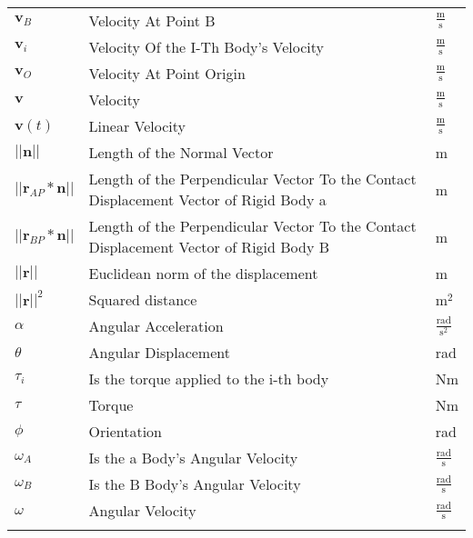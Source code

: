 \documentclass[12pt]{article}
\begin{document}
\begin{longtabu}{l X[l] l}
${\mathbf{v}_{B}}$ & Velocity At Point B & $\frac{\text{m}}{\text{s}}$
\\
${\mathbf{v}_{i}}$ & Velocity Of the I-Th Body's Velocity & $\frac{\text{m}}{\text{s}}$
\\
${\mathbf{v}_{O}}$ & Velocity At Point Origin & $\frac{\text{m}}{\text{s}}$
\\
$\mathbf{v}$ & Velocity & $\frac{\text{m}}{\text{s}}$
\\
$\mathbf{v}(t)$ & Linear Velocity & $\frac{\text{m}}{\text{s}}$
\\
$||\mathbf{n}||$ & Length of the Normal Vector & m
\\
$||{\mathbf{r}_{AP}}*\mathbf{n}||$ & Length of the Perpendicular Vector To the Contact Displacement Vector of Rigid Body a & m
\\
$||{\mathbf{r}_{BP}}*\mathbf{n}||$ & Length of the Perpendicular Vector To the Contact Displacement Vector of Rigid Body B & m
\\
$||\mathbf{r}||$ & Euclidean norm of the displacement & m
\\
${||\mathbf{r}||^{2}}$ & Squared distance & $\text{m}^{2}$
\\
$\alpha{}$ & Angular Acceleration & $\frac{\text{rad}}{\text{s}^{2}}$
\\
$\theta{}$ & Angular Displacement & rad
\\
${\tau{}_{i}}$ & Is the torque applied to the i-th body & Nm
\\
$\tau{}$ & Torque & Nm
\\
$\phi{}$ & Orientation & rad
\\
${\omega{}_{A}}$ & Is the a Body's Angular Velocity & $\frac{\text{rad}}{\text{s}}$
\\
${\omega{}_{B}}$ & Is the B Body's Angular Velocity & $\frac{\text{rad}}{\text{s}}$
\\
$\omega{}$ & Angular Velocity & $\frac{\text{rad}}{\text{s}}$
\\
\bottomrule
\label{Table:ToS}
\end{longtabu}
\end{document}
